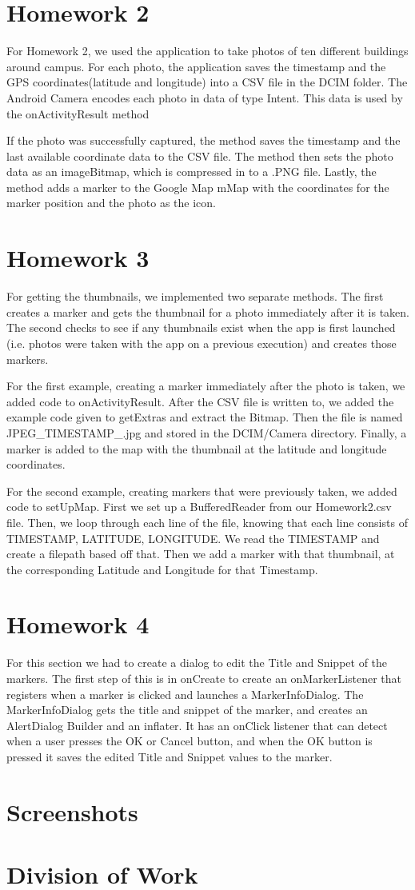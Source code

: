 \documentclass[]{article}
\begin{document}
\section{Homework 2}
For Homework 2, we used the application to take photos of ten different buildings around campus. For each photo, the application saves the timestamp and the GPS coordinates(latitude and longitude) into a CSV file in the DCIM folder. The Android Camera encodes each photo in data of type Intent. This data is used by the onActivityResult method

If the photo was successfully captured, the method saves the timestamp and the last available coordinate data to the CSV file. The method then sets the photo data as an imageBitmap, which is compressed in to a .PNG file. Lastly, the method adds a marker to the Google Map mMap with the coordinates for the marker position and the photo as the icon.

\section{Homework 3}
For getting the thumbnails, we implemented two separate methods. The first creates a marker and gets the thumbnail for a photo immediately after it is taken. The second checks to see if any thumbnails exist when the app is first launched (i.e. photos were taken with the app on a previous execution) and creates those markers.

For the first example, creating a marker immediately after the photo is taken, we added code to onActivityResult. After the CSV file is written to, we added the example code given to getExtras and extract the Bitmap. Then the file is named JPEG\_TIMESTAMP\_.jpg and stored in the DCIM/Camera directory. Finally, a marker is added to the map with the thumbnail at the latitude and longitude coordinates.

For the second example, creating markers that were previously taken, we added code to setUpMap. First we set up a BufferedReader from our Homework2.csv file. Then, we loop through each line of the file, knowing that each line consists of TIMESTAMP, LATITUDE, LONGITUDE. We read the TIMESTAMP and create a filepath based off that. Then we add a marker with that thumbnail, at the corresponding Latitude and Longitude for that Timestamp. 
\section{Homework 4}
For this section we had to create a dialog to edit the Title and Snippet of the markers. The first step of this is in onCreate to create an onMarkerListener that registers when a marker is clicked and launches a MarkerInfoDialog. The MarkerInfoDialog gets the title and snippet of the marker, and creates an AlertDialog Builder and an inflater. It has an onClick listener that can detect when a user presses the OK or Cancel button, and when the OK button is pressed it saves the edited Title and Snippet values to the marker. 
\section{Screenshots}
\section{Division of Work}
\end{document}
